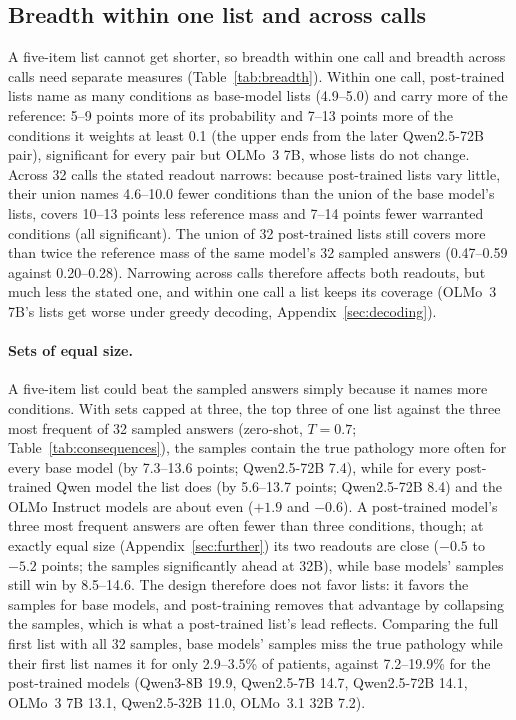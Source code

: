 \documentclass[11pt]{article}
\begin{document}
\subsection{Breadth within one list and across calls}\label{sec:breadth}
A five-item list cannot get shorter, so breadth within one call and breadth across calls need separate measures (Table~\ref{tab:breadth}). Within one call, post-trained lists name as many conditions as base-model lists (4.9--5.0) and carry more of the reference: 5--9 points more of its probability and 7--13 points more of the conditions it weights at least 0.1 (the upper ends from the later Qwen2.5-72B pair), significant for every pair but OLMo~3 7B, whose lists do not change. Across 32 calls the stated readout narrows: because post-trained lists vary little, their union names 4.6--10.0 fewer conditions than the union of the base model's lists, covers 10--13 points less reference mass and 7--14 points fewer warranted conditions (all significant). The union of 32 post-trained lists still covers more than twice the reference mass of the same model's 32 sampled answers (0.47--0.59 against 0.20--0.28). Narrowing across calls therefore affects both readouts, but much less the stated one, and within one call a list keeps its coverage (OLMo~3 7B's lists get worse under greedy decoding, Appendix~\ref{sec:decoding}).

\paragraph{Sets of equal size.} A five-item list could beat the sampled answers simply because it names more conditions. With sets capped at three, the top three of one list against the three most frequent of 32 sampled answers (zero-shot, $T{=}0.7$; Table~\ref{tab:consequences}), the samples contain the true pathology more often for every base model (by 7.3--13.6 points; Qwen2.5-72B 7.4), while for every post-trained Qwen model the list does (by 5.6--13.7 points; Qwen2.5-72B 8.4) and the OLMo Instruct models are about even ($+1.9$ and $-0.6$). A post-trained model's three most frequent answers are often fewer than three conditions, though; at exactly equal size (Appendix~\ref{sec:further}) its two readouts are close ($-0.5$ to $-5.2$ points; the samples significantly ahead at 32B), while base models' samples still win by 8.5--14.6. The design therefore does not favor lists: it favors the samples for base models, and post-training removes that advantage by collapsing the samples, which is what a post-trained list's lead reflects. Comparing the full first list with all 32 samples, base models' samples miss the true pathology while their first list names it for only 2.9--3.5\% of patients, against 7.2--19.9\% for the post-trained models (Qwen3-8B 19.9, Qwen2.5-7B 14.7, Qwen2.5-72B 14.1, OLMo~3 7B 13.1, Qwen2.5-32B 11.0, OLMo~3.1 32B 7.2).
\end{document}
